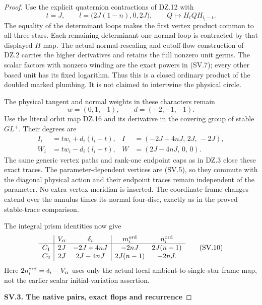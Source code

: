 \begin{proof}
Use the explicit quaternion contractions of DZ.12
with
\[
 t=J,\qquad
 l=\bigl(2J(1-n),0,2J\bigr),\qquad
                 Q\mapsto H_t QH_{l_i-t}.            \tag{SV.8}
\]
The equality of the determinant loops makes the
first vertex product common to all three stars.
Each remaining determinant-one normal loop is
contracted by that displayed \(H\) map. The actual
normal-rescaling and cutoff-flow construction of
DZ.2 carries the higher derivatives and retains
the full nonzero unit germs. The scalar factors
with nonzero winding are the exact powers in
(SV.7); every other based unit has its fixed
logarithm. Thus this is a closed ordinary product
of the doubled marked plumbing. It is not claimed
to intertwine the physical circle.

The physical tangent and normal weights in these
characters remain
\[
                  w=(0,1,-1),\qquad d=(-2,-1,-1).
\]
Use the literal orbit map DZ.16 and its derivative
in the covering group of stable \(GL^+\). Their
degrees are
\[
 \begin{aligned}
 I_i&=t w_i+d_i(l_i-t),&
 I&=(-2J+4nJ,\,2J,\,-2J),\\
 W_i&=t w_i-d_i(l_i-t),&
 W&=(2J-4nJ,\,0,\,0).
 \end{aligned}                                          \tag{SV.9}
\]
The same generic vertex paths and rank-one endpoint
caps as in DZ.3 close these exact traces. The
parameter-dependent vertices are (SV.5), so they
commute with the diagonal physical action and
their endpoint traces remain independent of the
parameter. No extra vertex meridian is inserted.
The coordinate-frame changes extend over the
annulus times its normal four-disc, exactly as
in the proved stable-trace comparison.

The integral prism identities now give
\[
 \begin{array}{c|cc|cc}
 &V_{ii}&\delta_i&m_i^{\rm ord}&n_i^{\rm ord}\\ \hline
 C_1&2J&-2J+4nJ&-2nJ&2J(n-1)\\
 C_2&2J& 2J-4nJ&2J(n-1)&-2nJ .
 \end{array}                                          \tag{SV.10}
\]
Here \(2n_i^{\rm ord}=\delta_i-V_{ii}\) uses only
the actual local ambient-to-single-star frame map,
not the earlier scalar initial-variation assertion.

\par

\medskip\noindent\textbf{SV.3. The native pairs, exact flops and recurrence}

\par\nobreak


\end{proof}
